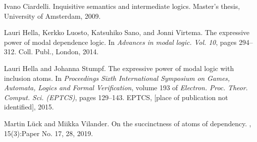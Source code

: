 \documentclass[bsl,meeting]{asl}
\begin{document}
\begin{thebibliography}{10}


Ivano Ciardelli.
\newblock Inquisitive semantics and intermediate logics.
\newblock Master's thesis, University of Amsterdam, 2009.

Lauri Hella, Kerkko Luosto, Katsuhiko Sano, and Jonni Virtema.
\newblock The expressive power of modal dependence logic.
\newblock In {\em Advances in modal logic. {V}ol. 10}, pages 294--312. Coll.
  Publ., London, 2014.

Lauri Hella and Johanna Stumpf.
\newblock The expressive power of modal logic with inclusion atoms.
\newblock In {\em Proceedings {S}ixth {I}nternational {S}ymposium on {G}ames,
  {A}utomata, {L}ogics and {F}ormal {V}erification}, volume 193 of {\em
  Electron. Proc. Theor. Comput. Sci. (EPTCS)}, pages 129--143. EPTCS, [place
  of publication not identified], 2015.

Martin L\"{u}ck and Miikka Vilander.
\newblock On the succinctness of atoms of dependency.
, 15(3):Paper No. 17, 28, 2019.

\end{thebibliography}



\vspace*{-0.5\baselineskip}
\end{document}
